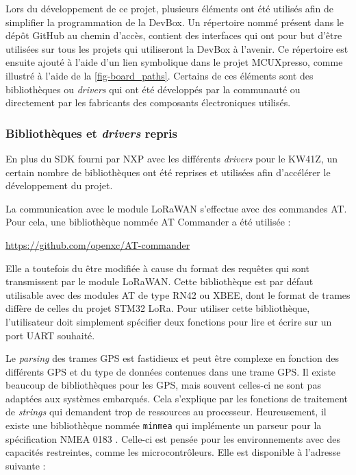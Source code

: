 Lors du développement de ce projet, plusieurs éléments ont été utilisés afin de simplifier la programmation de la DevBox. Un répertoire nommé  présent dans le dépôt GitHub au chemin d'accès,  contient des interfaces qui ont pour but d'être utilisées sur tous les projets qui utiliseront la DevBox à l'avenir. Ce répertoire est ensuite ajouté à l'aide d'un lien symbolique dans le projet MCUXpresso, comme illustré à l'aide de la \cref{fig-board_paths}. Certains de ces éléments sont des bibliothèques ou \textit{drivers} qui ont été développés par la communauté ou directement par les fabricants des composants électroniques utilisés.


\subsubsection{Bibliothèques et \textit{drivers} repris}

En plus du SDK fourni par NXP avec les différents \textit{drivers} pour le KW41Z, un certain nombre de bibliothèques ont été reprises et utilisées afin d'accélérer le développement du projet.

\label{sec-software_libs_atcommander}
La communication avec le module LoRaWAN s'effectue avec des commandes AT. Pour cela, une bibliothèque nommée AT Commander a été utilisée : 
\begin{center}
    \url{https://github.com/openxc/AT-commander}
\end{center}

Elle a toutefois du être modifiée à cause du format des requêtes qui sont transmissent par le module LoRaWAN. Cette bibliothèque est par défaut utilisable avec des modules AT de type RN42 ou XBEE, dont le format de trames diffère de celles du projet STM32 LoRa. Pour utiliser cette bibliothèque, l'utilisateur doit simplement spécifier deux fonctions pour lire et écrire sur un port UART souhaité. 

\label{sec-software_libs_minmea}

Le \textit{parsing} des trames GPS est fastidieux et peut être complexe en fonction des différents GPS et du type de données contenues dans une trame GPS. Il existe beaucoup de bibliothèques pour les GPS, mais souvent celles-ci ne sont pas adaptées aux systèmes embarqués. Cela s'explique par les fonctions de traitement de \textit{strings} qui demandent trop de ressources au processeur. Heureusement, il existe une bibliothèque nommée \texttt{minmea} qui implémente un parseur pour la spécification NMEA 0183 \cite{NMEA018318:online}. Celle-ci est pensée pour les environnements avec des capacités restreintes, comme les microcontrôleurs. Elle est disponible à l'adresse suivante :

